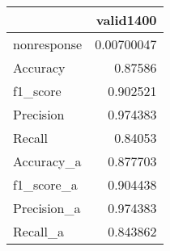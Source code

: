 
\begin{tabular}{lr}
\hline
             &      valid1400 \\
\hline
 nonresponse & 0.00700047 \\
 Accuracy    & 0.87586    \\
 f1_score    & 0.902521   \\
 Precision   & 0.974383   \\
 Recall      & 0.84053    \\
 Accuracy_a  & 0.877703   \\
 f1_score_a  & 0.904438   \\
 Precision_a & 0.974383   \\
 Recall_a    & 0.843862   \\
\hline
\end{tabular}